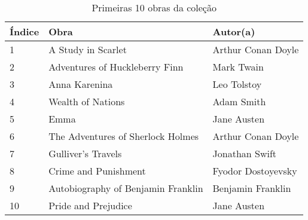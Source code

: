 \documentclass{article}
\begin{document}
\begin{table}[h]
  \begin{center}
    \tiny
    \begin{tabular}{| l | l | l |}
    \hline
Índice & Obra & Autor(a) \\
    \hline
1 & A Study in Scarlet & Arthur Conan Doyle \\
2 & Adventures of Huckleberry Finn & Mark Twain \\
3 & Anna Karenina & Leo Tolstoy \\
4 & Wealth of Nations & Adam Smith \\
5 & Emma & Jane Austen \\
6 & The Adventures of Sherlock Holmes & Arthur Conan Doyle \\
7 & Gulliver's Travels & Jonathan Swift \\
8 & Crime and Punishment & Fyodor Dostoyevsky \\
9 & Autobiography of Benjamin Franklin & Benjamin Franklin \\
10 & Pride and Prejudice & Jane Austen \\
    \hline
    \end{tabular}
    \caption{Primeiras 10 obras da coleção} 
    \label{tab:books}
  \end{center}
\end{table}
\end{document}

